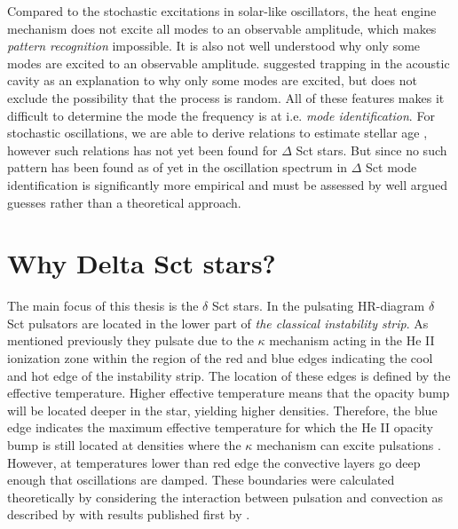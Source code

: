 Compared to the stochastic excitations in solar-like oscillators, the heat engine mechanism does not excite all modes to an observable amplitude, which makes \textit{pattern recognition} impossible.  It is also not well understood why only some modes are excited to an observable amplitude. \citep{dziembowski1990} suggested trapping in the acoustic cavity as an explanation to why only some modes are excited, but does not exclude the possibility that the process is random. All of these features makes it difficult to determine the mode the frequency is at i.e. \textit{mode identification}. For stochastic oscillations, we are able to derive relations to estimate stellar age \citep{kjeldsen}, however such relations has not yet been found for $\Delta $ Sct stars. But since no such pattern has been found as of yet in the oscillation spectrum in $\Delta $ Sct mode identification is significantly more empirical and must be assessed by well argued guesses rather than a theoretical approach.  


\section{Why Delta Sct stars?}
\label{sec:why}

The main focus of this thesis is the $\delta$ Sct stars. In the pulsating HR-diagram $\delta$ Sct pulsators are located in the lower part of \textit{the classical instability strip}. As mentioned previously they pulsate due to the $\kappa$ mechanism acting in the He II ionization zone within the region of the red and blue edges indicating the cool and hot edge of the instability strip. The location of these edges is defined by the effective temperature. Higher effective temperature means that the opacity bump will be located deeper in the star, yielding higher densities. Therefore, the blue edge indicates the maximum effective temperature for which the He II opacity bump is still located at densities where the $\kappa$ mechanism can excite pulsations \citet{pamyatnykh2000}. However, at temperatures lower than red edge the convective layers go deep enough that oscillations are damped. These boundaries were calculated theoretically by considering the interaction between pulsation and convection as described by \citep{grigahcene2005convection} with results published first by \citet{dupret2004theoretical}.  

